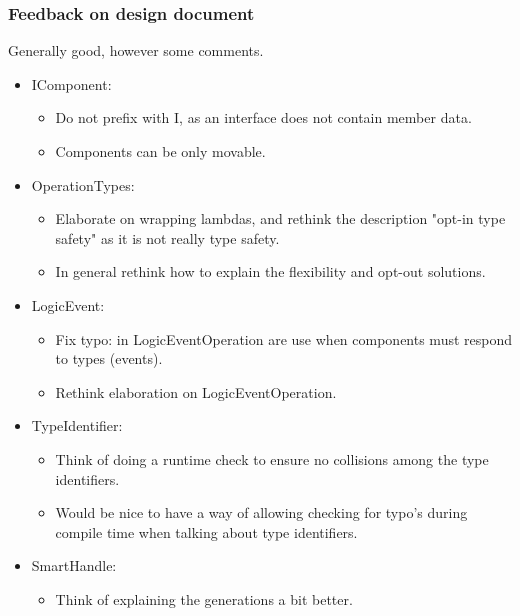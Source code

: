 \documentclass{article}
\begin{document}
\subsubsection*{Feedback on design document}
Generally good, however some comments.
\begin{itemize}
    \item
    IComponent:
    \begin{itemize}
        \item
        Do not prefix with I, as an interface does not contain member data.

        \item
        Components can be only movable.
    \end{itemize}

    \item
    OperationTypes:
    \begin{itemize}
        \item
        Elaborate on wrapping lambdas, and rethink the description "opt-in type safety" as it is not really type safety.

        \item
        In general rethink how to explain the flexibility and opt-out solutions.
    \end{itemize}

    \item
    LogicEvent:
    \begin{itemize}
        \item
        Fix typo: in LogicEventOperation are use when components must respond to types (events).

        \item
        Rethink elaboration on LogicEventOperation.
    \end{itemize}

    \item
    TypeIdentifier:
    \begin{itemize}
        \item
        Think of doing a runtime check to ensure no collisions among the type identifiers.

        \item
        Would be nice to have a way of allowing checking for typo's during compile time when talking about type identifiers.
    \end{itemize}

    \item
    SmartHandle:
    \begin{itemize}
        \item
        Think of explaining the generations a bit better.
    \end{itemize}


\end{itemize}
\end{document}

